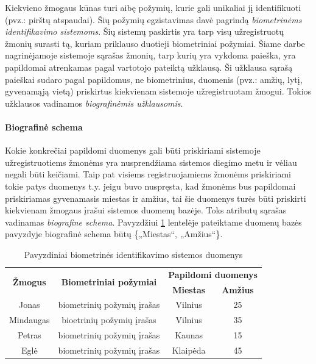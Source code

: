 

Kiekvieno žmogaus kūnas turi aibę požymių, kurie gali unikaliai jį identifikuoti (pvz.: pirštų atspaudai).
Šių požymių egzistavimas davė pagrindą {\it biometrinėms identifikavimo sistemoms}.
Šių sistemų paskirtis yra tarp visų užregistruotų žmonių surasti tą, kuriam priklauso duotieji biometriniai požymiai.
Šiame darbe nagrinėjamoje sistemoje \cite{NeurotechnologyMegamatcherAccelerator} sąrašas žmonių, tarp kurių yra vykdoma paieška, yra papildomai atrenkamas pagal vartotojo pateiktą užklausą.
Ši užklausa sąrašą paieškai sudaro pagal papildomus, ne biometrinius, duomenis (pvz.: amžių, lytį, gyvenamąją vietą) priskirtus kiekvienam sistemoje užregistruotam žmogui.
Tokios užklausos vadinamos {\it biografinėmis užklausomis}.

\paragraph{Biografinė schema}
Kokie konkrečiai papildomi duomenys gali būti priskiriami sistemoje užregistruotiems žmonėms yra nusprendžiama sistemos diegimo metu ir vėliau negali būti keičiami.
Taip pat visiems registruojamiems žmonėms priskiriami tokie patys duomenys t.y. jeigu buvo nuspręsta, kad žmonėms bus papildomai priskiriamas gyvenamasis miestas ir amžius, tai šie duomenys turės būti priskirti kiekvienam žmogaus įrašui sistemos duomenų bazėje.
Toks atributų sąrašas vadinamas {\it biografine schema}.
Pavyzdžiui \ref{tab:exampleGallery} lentelėje pateiktame duomenų bazės pavyzdyje biografinė schema būtų \{„Miestas“, „Amžius“\}.

\begin{table}[H]\footnotesize
	\centering
	\begin{tabular}{|c|c|c|c|}
		\hline
		\multirow{2}{*}{{\bf Žmogus}} & \multirow{2}{*}{{\bf Biometriniai požymiai}} & \multicolumn{2}{|c|}{{\bf Papildomi duomenys}}  \\ \cline{3-4}
		& & {\bf Miestas} & {\bf Amžius} \\
		\hline
		Jonas  & biometrinių požymių įrašas & Vilnius & 25 \\ \cline{2-4}
		\hline
		Mindaugas & bioetrinių požymių įrašas & Vilnius & 35 \\ \cline{2-4}
		\hline
		Petras & biometrinių požymių įrašas & Kaunas & 15 \\ \cline{2-4}
		\hline
		Eglė & biometrinių požymių įrašas & Klaipėda & 45 \\ \cline{2-4}
		\hline
	\end{tabular}
	\caption{Pavyzdiniai biometrinės identifikavimo sistemos duomenys}
	\label{tab:exampleGallery}
\end{table}



